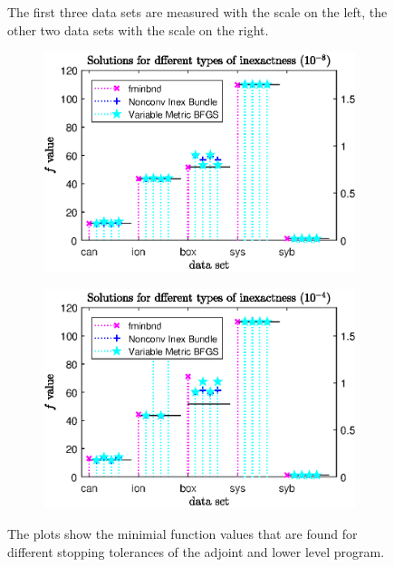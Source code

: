 \begin{figure}[ht]
{	The first three data sets are measured with the scale on the left, the other two data sets with the scale on the right.}%
	\label{fig_llad84C}%
\end{figure}

\begin{figure}[ht]
	\begin{subfigure}{0.49\textwidth}
		\includegraphics[width=\textwidth]{Pictures/Plots/Scal100_llad-8f.eps}%
	\end{subfigure}%
	\hfill
	\begin{subfigure}{0.49\textwidth}
		\includegraphics[width=\textwidth]{Pictures/Plots/Scal100_llad-4f.eps}%
	\end{subfigure}
	\caption[Minimal values for different stopping tolerances of the lower level and adjoint program]{The plots show the minimial function values that are found for different stopping tolerances of the adjoint and lower level program.\\
}
\end{figure}

